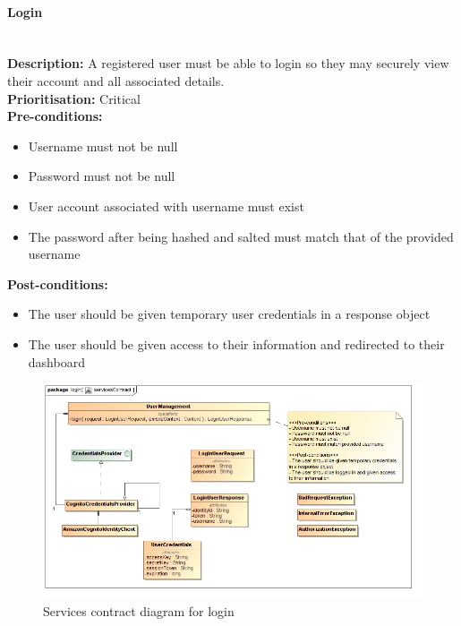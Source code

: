 \documentclass{article}
\begin{document}
\paragraph{Login}\mbox{}\\
\textbf{Description:} A registered user must be able to login so they may securely view their account and all associated details.\\
\textbf{Prioritisation:} Critical\\		
\textbf{Pre-conditions:}
\begin{itemize}
	\item Username must not be null
	\item Password must not be null
	\item User account associated with username must exist
	\item The password after being hashed and salted must match that of the provided username
\end{itemize}
\textbf{Post-conditions:}
\begin{itemize}
	\item The user should be given temporary user credentials in a response object
	\item The user should be given access to their information and redirected to their dashboard
\end{itemize}	

\begin{figure}[H]
	\includegraphics[width=\linewidth]{images/ServicesContracts/login.jpg}
	\caption{Services contract diagram for login}
\end{figure}
\end{document}
